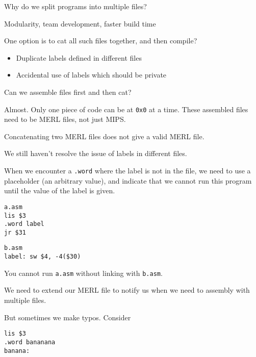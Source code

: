 \documentclass{article}
\begin{document}
Why do we split programs into multiple files?

Modularity, team development, faster build time



One option is to cat all such files together, and then compile? 

\begin{itemize}
    \item Duplicate labels defined in different files
    \item Accidental use of labels
which should be private
\end{itemize}

Can we assemble files first and then cat?

Almost. Only one piece of code can be at \texttt{0x0} at a time. These
assembled files need to be MERL files, not just MIPS.

Concatenating two MERL files does not give a valid MERL file.

We still haven't resolve the issue of labels in different files.

When we encounter a \texttt{.word} where the label is not in the file,
we need to use a placeholder (an arbitrary value), and indicate that we
cannot run this program until the value of the label is given.

\begin{tcolorbox}
\begin{verbatim}
a.asm
lis $3
.word label
jr $31
\end{verbatim}
\end{tcolorbox}

\begin{tcolorbox}
\begin{verbatim}
b.asm
label: sw $4, -4($30)
\end{verbatim}
\end{tcolorbox}

You cannot run \texttt{a.asm} without linking with \texttt{b.asm}.

We need to extend our MERL file to notify us when we need to assembly
with multiple files.

But sometimes we make typos. Consider

\begin{tcolorbox}
\begin{verbatim}
lis $3
.word bananana
banana:
\end{verbatim}
\end{tcolorbox}
\end{document}
